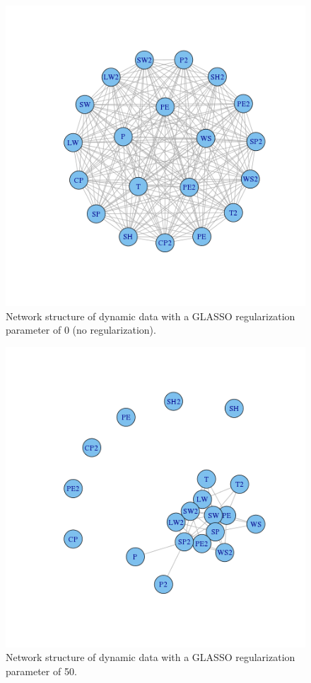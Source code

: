 \documentclass{article}
\begin{document}
\begin{figure}
\includegraphics[width=0.9\columnwidth]{images/dynamic_0.png}
\caption{Network structure of dynamic data with a GLASSO regularization parameter of 0 (no regularization).}
\label{fig:dynamic_0}
\end{figure}

\begin{figure}
\includegraphics[width=0.9\columnwidth]{images/dynamic_50.png}
\caption{Network structure of dynamic data with a GLASSO regularization parameter of 50.}
\label{fig:dynamic_50}
\end{figure}
\end{document}
